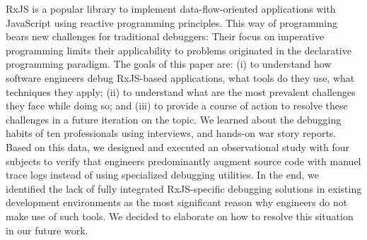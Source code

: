 RxJS is a popular library to implement data-flow-oriented applications with JavaScript using reactive programming principles. This way of programming bears new challenges for traditional debuggers: Their focus on imperative programming limits their applicability to problems originated in the declarative programming paradigm. The goals of this paper are: (i) to understand how software engineers debug RxJS-based applications, what tools do they use, what techniques they apply; (ii) to understand what are the most prevalent challenges they face while doing so; and (iii) to provide a course of action to resolve these challenges in a future iteration on the topic. We learned about the debugging habits of ten professionals using interviews, and hands-on war story reports. Based on this data, we designed and executed an observational study with four subjects to verify that engineers predominantly augment source code with manuel trace logs instead of using specialized debugging utilities. In the end, we identified the lack of fully integrated RxJS-specific debugging solutions in existing development environments as the most significant reason why engineers do not make use of such tools. We decided to elaborate on how to resolve this situation in our future work.